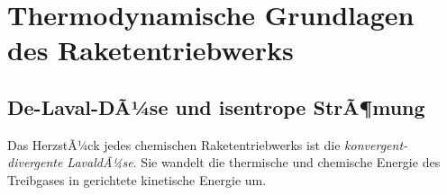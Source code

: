 ﻿\documentclass[12pt,a4paper]{article}
\begin{document}
\section{Thermodynamische Grundlagen des Raketentriebwerks}

\subsection{De-Laval-DÃ¼se und isentrope StrÃ¶mung}

Das HerzstÃ¼ck jedes chemischen Raketentriebwerks ist die \emph{konvergent-divergente
LavaldÃ¼se}. Sie wandelt die thermische und chemische Energie des Treibgases in
gerichtete kinetische Energie um.
\end{document}
